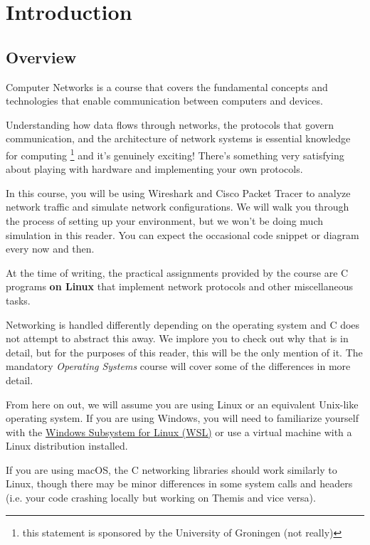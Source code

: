 \chapter{Introduction}
\section{Overview}
Computer Networks is a course that covers the fundamental concepts and technologies that enable communication between computers and devices. 

Understanding how data flows through networks, the protocols that govern communication, and the architecture of network systems is essential knowledge for computing \footnote{this statement is sponsored by the University of Groningen ({\tiny not really})} and it's genuinely exciting! There's something very satisfying about playing with hardware and implementing your own protocols.

In this course, you will be using Wireshark and Cisco Packet Tracer to analyze network traffic and simulate network configurations. We will walk you through the process of setting up your environment, but we won't be doing much simulation in this reader. You can expect the occasional code snippet or diagram every now and then.

At the time of writing, the practical assignments provided by the course are C programs \textbf{on Linux} that implement network protocols and other miscellaneous tasks.

\begin{importantblock}
Networking is handled differently depending on the operating system and C does not attempt to abstract this away. We implore you to check out why that is in detail, but for the purposes of this reader, this will be the only mention of it. The mandatory \textit{Operating Systems} course will cover some of the differences in more detail.

\vspace{1em}
From here on out, we will assume you are using Linux or an equivalent Unix-like operating system. If you are using Windows, you will need to familiarize yourself with the \href{https://docs.microsoft.com/en-us/windows/wsl/install}{Windows Subsystem for Linux (WSL)} or use a virtual machine with a Linux distribution installed.

\vspace{1em}
If you are using macOS, the C networking libraries should work similarly to Linux, though there may be minor differences in some system calls and headers (i.e. your code crashing locally but working on Themis and vice versa).
\end{importantblock}

